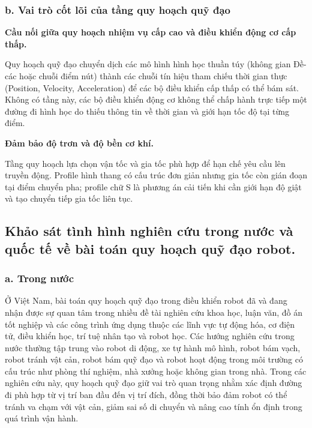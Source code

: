 \documentclass[12pt,a4paper,oneside]{report}
\begin{document}
\subsubsection*{b. Vai trò cốt lõi của tầng quy hoạch quỹ đạo}

\noindent\textbf{Cầu nối giữa quy hoạch nhiệm vụ cấp cao và điều khiển động cơ cấp thấp.}

Quy hoạch quỹ đạo chuyển dịch các mô hình hình học thuần túy (không gian Đề-các hoặc chuỗi điểm nút) thành các chuỗi tín hiệu tham chiếu thời gian thực (Position, Velocity, Acceleration) để các bộ điều khiển cấp thấp có thể bám sát. Không có tầng này, các bộ điều khiển động cơ không thể chấp hành trực tiếp một đường đi hình học do thiếu thông tin về thời gian và giới hạn tốc độ tại từng điểm.

\noindent\textbf{Đảm bảo độ trơn và độ bền cơ khí.}

Tầng quy hoạch lựa chọn vận tốc và gia tốc phù hợp để hạn chế yêu cầu lên truyền động. Profile hình thang có cấu trúc đơn giản nhưng gia tốc còn gián đoạn tại điểm chuyển pha; profile chữ S là phương án cải tiến khi cần giới hạn độ giật và tạo chuyển tiếp gia tốc liên tục.

\subsection{Khảo sát tình hình nghiên cứu trong nước và quốc tế về bài toán quy hoạch quỹ đạo robot.}

\subsubsection*{a. Trong nước}

Ở Việt Nam, bài toán quy hoạch quỹ đạo trong điều khiển robot đã và đang nhận được sự quan tâm trong nhiều đề tài nghiên cứu khoa học, luận văn, đồ án tốt nghiệp và các công trình ứng dụng thuộc các lĩnh vực tự động hóa, cơ điện tử, điều khiển học, trí tuệ nhân tạo và robot học. Các hướng nghiên cứu trong nước thường tập trung vào robot di động, xe tự hành mô hình, robot bám vạch, robot tránh vật cản, robot bám quỹ đạo và robot hoạt động trong môi trường có cấu trúc như phòng thí nghiệm, nhà xưởng hoặc không gian trong nhà. Trong các nghiên cứu này, quy hoạch quỹ đạo giữ vai trò quan trọng nhằm xác định đường đi phù hợp từ vị trí ban đầu đến vị trí đích, đồng thời bảo đảm robot có thể tránh va chạm với vật cản, giảm sai số di chuyển và nâng cao tính ổn định trong quá trình vận hành.
\end{document}
